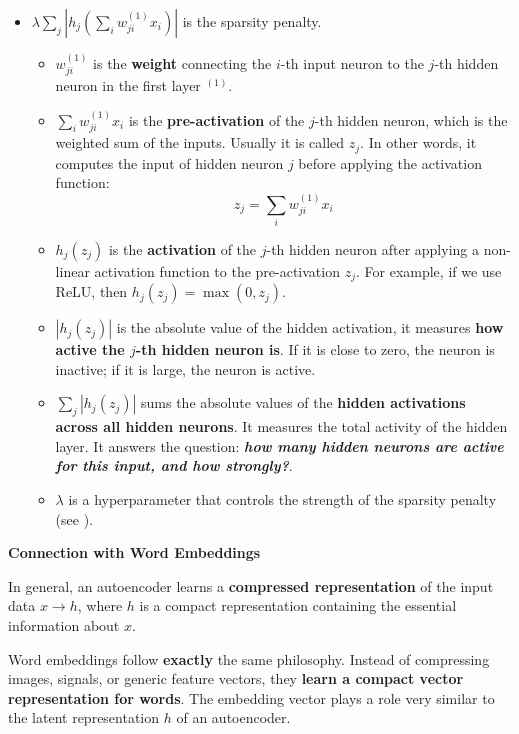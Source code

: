 \begin{definitionbox}[: Autoencoder]
\begin{itemize}
        \item $\lambda \displaystyle\sum_{j} \left| h_j \left(\displaystyle\sum_{i} w_{ji}^{(1)} x_{i}\right) \right|$ is the sparsity penalty.
        \begin{itemize}
            \item $w_{ji}^{(1)}$ is the \textbf{weight} connecting the $i$-th input neuron to the $j$-th hidden neuron in the first layer $^{(1)}$.
            \item $\displaystyle\sum_{i} w_{ji}^{(1)} x_{i}$ is the \textbf{pre-activation} of the $j$-th hidden neuron, which is the weighted sum of the inputs. Usually it is called $z_j$. In other words, it computes the input of hidden neuron $j$ before applying the activation function:
            \begin{equation*}
                z_j = \sum_{i} w_{ji}^{(1)} x_{i}
            \end{equation*}
            \item $h_j\left(z_j\right)$ is the \textbf{activation} of the $j$-th hidden neuron after applying a non-linear activation function to the pre-activation $z_j$. For example, if we use ReLU, then $h_j(z_j) = \max(0, z_j)$.
            \item $\left| h_j(z_j) \right|$ is the absolute value of the hidden activation, it measures \textbf{how active the $j$-th hidden neuron is}. If it is close to zero, the neuron is inactive; if it is large, the neuron is active.
            \item $\displaystyle\sum_{j} \left| h_j(z_j) \right|$ sums the absolute values of the \textbf{hidden activations across all hidden neurons}. It measures the total activity of the hidden layer. It answers the question: \emph{\textbf{how many hidden neurons are active for this input, and how strongly?}}.
            \item $\lambda$ is a hyperparameter that controls the strength of the sparsity penalty (see ).
        \end{itemize}
    \end{itemize}
\end{definitionbox}


\highspace
\begin{flushleft}
    \textcolor{Green3}{ \textbf{Connection with Word Embeddings}}
\end{flushleft}
In general, an autoencoder learns a \textbf{compressed representation} of the input data $x \to h$, where $h$ is a compact representation containing the essential information about $x$.

\highspace
Word embeddings follow \textbf{exactly} the same philosophy. Instead of compressing images, signals, or generic feature vectors, they \textbf{learn a compact vector representation for words}. The embedding vector plays a role very similar to the latent representation $h$ of an autoencoder.